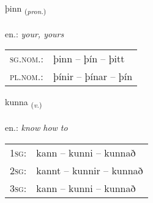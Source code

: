 \documentclass[frontgrid, backgrid]{flacards}\usepackage[]{graphicx}\usepackage[]{xcolor}
\begin{document}
\renewcommand{\blhead}{\vskip5pt {\small\bfseries\footnotesize Fornafn | Pronoun }}
\renewcommand{\bcfoot}{\vskip5pt \hspace{2pt}{\small\bfseries\footnotesize 1K}}


{þinn \small{\textsubscript{(\textit{pron.})}} \\[1ex] %
\textphonetic{[θɪn]} \\
en.: \emph{your, yours} \\  [2ex]
\renewcommand*{\arraystretch}{0.8}
\begin{tabular}{ll}
\textsc{sg.nom.}: & þinn  --  þín -- þitt \\ 
\textsc{pl.nom.}: & þínir -- þínar -- þín
\end{tabular}
}

\renewcommand{\flhead}{\vskip5pt \fboxsep=0pt {\small\bfseries\footnotesize Sagnorð | Verb}}
\renewcommand{\fcfoot}{\vskip5pt \fboxsep=0pt \hspace{2pt}{\small\bfseries\footnotesize 1K}}

\renewcommand{\blhead}{\vskip5pt {\small\bfseries\footnotesize Sagnorð | Verb }}
\renewcommand{\bcfoot}{\vskip5pt \hspace{2pt}{\small\bfseries\footnotesize 1K}}


{kunna \small{\textsubscript{(\textit{v.})}} \\[1ex] %
\textphonetic{[kʰʏna]} \\
en.: \emph{know how to} \\  [2ex]
\renewcommand*{\arraystretch}{0.8}
\begin{tabular}{p{1cm}l}
\textsc{1sg}: & kann -- kunni -- kunnað \\ 
\textsc{2sg}: & kannt -- kunnir -- kunnað \\ 
\textsc{3sg}: & kann -- kunni -- kunnað \\ 
\end{tabular}
}

\renewcommand{\flhead}{\vskip5pt \fboxsep=0pt {\small\bfseries\footnotesize Nafnorð | Noun}}
\renewcommand{\fcfoot}{\vskip5pt \fboxsep=0pt \hspace{2pt}{\small\bfseries\footnotesize 1K}}
\end{document}

